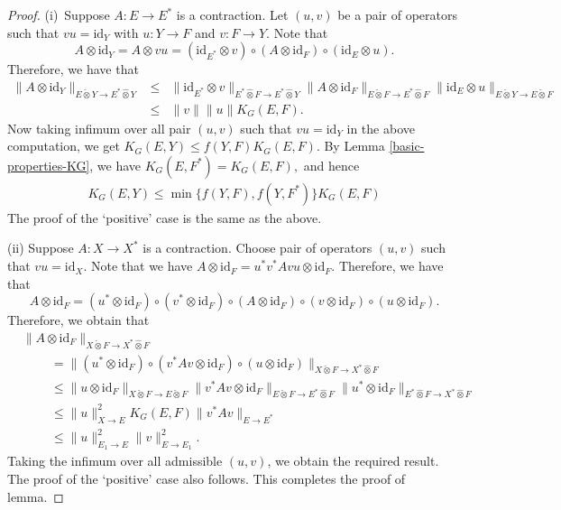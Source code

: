\documentclass[10pt,a4paper]{amsart}
\begin{document}
\begin{proof}
 (i)~Suppose $A:E\to E^*$ is a contraction. Let $(u,v)$ be a pair of operators such that $vu=\text{id}_{Y}$ with $u:Y\to F$ and $v:F\to Y.$ Note that \[A\otimes \text{id}_{Y}=A\otimes vu=(\text{id}_{E^*}\otimes v)\circ(A\otimes\text{id}_F)\circ (\text{id}_E\otimes u).\] Therefore, we have that
 \begin{eqnarray*}\|A\otimes\text{id}_{Y}\|_{E\check{\otimes}Y\to E^*\hat{\otimes}Y}
&\leqslant &\|\text{id}_{E^*}\otimes v\|_{E^*\hat{\otimes}F\to E^*\hat{\otimes}Y}
\|A\otimes\text{id}_F\|_{E\check{\otimes}F\to E^*\hat{\otimes}F}\|\text{id}_{E}\otimes u\|_{E\check{\otimes}Y\to E\check{\otimes}F}\\
&\leqslant& \|v\|\|u\|K_G(E,F).
\end{eqnarray*}
 Now taking infimum over all pair $(u,v)$ such that $vu=\text{id}_Y$ in the above computation, we get  $K_G(E,Y)\leqslant f(Y,F)K_G(E,F).$ By Lemma \ref{basic-properties-KG}, we have $K_G(E,F^*)=K_G(E,F),$ and hence
 \begin{eqnarray*}
 K_G(E,Y)\leqslant \min\{f(Y,F),f(Y,F^*)\} K_G(E,F)
 \end{eqnarray*}
 The proof of the `positive' case is the same as the above.



(ii) Suppose $A:X\to X^*$ is a contraction. 
Choose pair of operators $(u,v)$ such that $vu=\text{id}_{X}.$ Note that we have $A\otimes\text{id}_F=u^*v^*Avu\otimes\text{id}_F.$ Therefore, we have that
\[A\otimes \text{id}_F=(u^*\otimes\text{id}_F)\circ (v^*\otimes\text{id}_F)\circ (A\otimes\text{id}_F)\circ (v\otimes\text{id}_F)\circ (u\otimes\text{id}_F).\] 
Therefore, we obtain that 
\begin{equation*}
\begin{split}
&\|A\otimes\text{id}_F\|_{X\check{\otimes}F\to X^*\hat{\otimes}F}\\
&\phantom{Ohm}=\|(u^*\otimes\text{id}_F)\circ (v^*Av\otimes\text{id}_F)\circ (u\otimes\text{id}_F)\|_{X\check{\otimes}F\to X^*\hat{\otimes}F}\\
&\phantom{Ohm}\leqslant\|u\otimes \text{id}_F\|_{X\check{\otimes}F\to E\check{\otimes}F}\|v^*Av\otimes \text{id}_F\|_{E\check{\otimes}F\to E^*\hat{\otimes}F}\|u^*\otimes\text{id}_F\|_{E^*\hat{\otimes}F\to X^*\hat{\otimes}F}\\
&\phantom{Ohm}\leqslant\|u\|_{X\to E}^2K_G(E,F)\|v^*Av\|_{E\to E^*}\\
&\phantom{Ohm}\leqslant\|u\|_{E_1\to E}^2\|v\|_{E\to E_1}^2.
\end{split}
\end{equation*}
Taking the infimum over all admissible $(u,v)$, we obtain the required result.
 The proof of the `positive' case also follows.
This completes the proof of lemma.
\end{proof}
\end{document}
